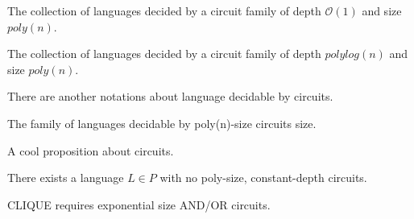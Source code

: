 \begin{definition}[Family $AC^0$]
    The collection of languages decided by a circuit family of depth $\mathcal{O}(1)$ and size $poly(n)$. %
\end{definition}

\begin{definition}[Family $NC$]
    The collection of languages decided by a circuit family of depth $polylog(n)$ and size $poly(n)$.
\end{definition}

There are another notations about language decidable by circuits.

\begin{definition}[P-Poly]
    The family of languages decidable by poly(n)-size circuits size.
\end{definition}

A cool proposition about circuits.

\begin{proposition}[Has 86]
    There exists a language $L \in P$ with no poly-size, constant-depth circuits.
\end{proposition}

\begin{proposition}[CLIQUE]
    CLIQUE requires exponential size AND/OR circuits.
\end{proposition}



